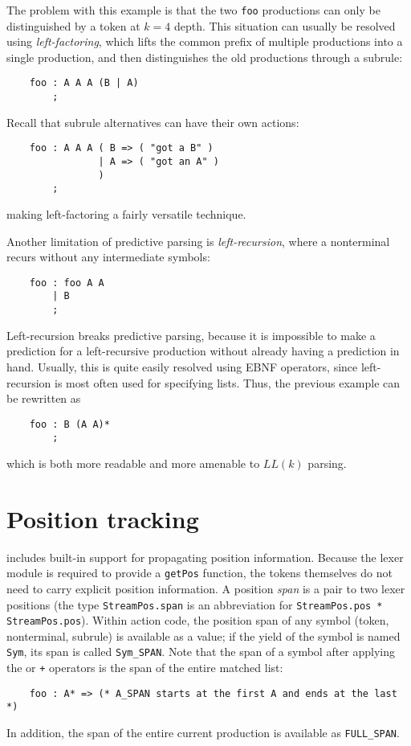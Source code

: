 The problem with this example is that the two {\tt foo} productions can only be distinguished by a token at $k = 4$ depth.  This situation can usually be resolved using \emph{left-factoring}, which lifts the common prefix of multiple productions into a single production, and then distinguishes the old productions through a subrule:
\begin{verbatim}
    foo : A A A (B | A)
        ;
\end{verbatim}
Recall that subrule alternatives can have their own actions:
\begin{verbatim}
    foo : A A A ( B => ( "got a B" ) 
                | A => ( "got an A" )
                )
        ;
\end{verbatim}
making left-factoring a fairly versatile technique.

Another limitation of predictive parsing is \emph{left-recursion}, where a nonterminal recurs without any intermediate symbols:
\begin{verbatim}
    foo : foo A A
        | B
        ;
\end{verbatim}
Left-recursion breaks predictive parsing, because it is impossible to make a prediction for a left-recursive production without already having a prediction in hand.  Usually, this is quite easily resolved using EBNF operators, since left-recursion is most often used for specifying lists.  Thus, the previous example can be rewritten as
\begin{verbatim}
    foo : B (A A)*
        ;
\end{verbatim}
which is both more readable and more amenable to $LL(k)$ parsing.

\section{Position tracking}

\antlr{} includes built-in support for propagating position information.  Because the lexer module is required to provide a {\tt getPos} function, the tokens themselves do not need to carry explicit position information.
A position \emph{span} is a pair to two lexer positions (the type {\tt StreamPos.span} is an abbreviation for {\tt StreamPos.pos * StreamPos.pos}).
Within action code, the position span of any symbol (token, nonterminal, subrule) is available as a value; if the yield of the symbol is named {\tt Sym}, its span is called {\tt Sym\_SPAN}.
Note that the span of a symbol after applying the {\tt *} or {\tt +} operators is the span of the entire matched list:
\begin{verbatim}
    foo : A* => (* A_SPAN starts at the first A and ends at the last *)
\end{verbatim}
In addition, the span of the entire current production is available as {\tt FULL\_SPAN}.

